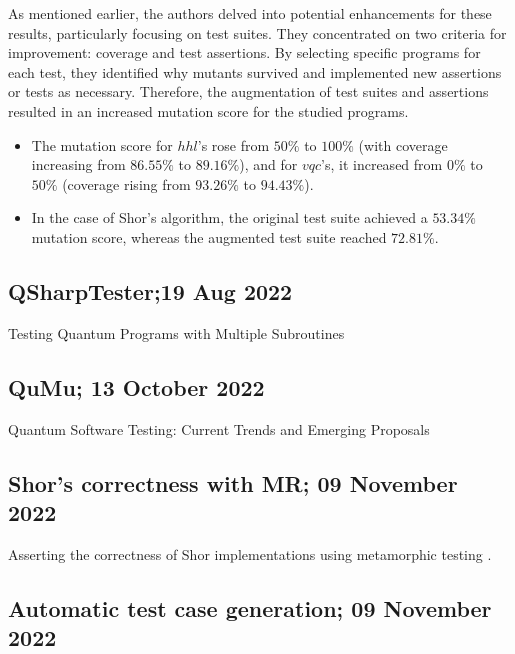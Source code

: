 \begin{itemize}
As mentioned earlier, the authors delved into potential enhancements for these results, particularly focusing on test suites. They concentrated on two criteria for improvement: coverage and test assertions. By selecting specific programs for each test, they identified why mutants survived and implemented new assertions or tests as necessary. Therefore, the augmentation of test suites and assertions resulted in an increased mutation score for the studied programs.

\begin{itemize}
    \item The mutation score for $hhl$’s rose from $50\%$ to $100\%$ (with coverage increasing from $86.55\%$ to $89.16\%$), and for $vqc$’s, it increased from $0\%$ to $50\%$ (coverage rising from $93.26\%$ to $94.43\%$).
    \item In the case of Shor's algorithm, the original test suite achieved a $53.34\%$ mutation score, whereas the augmented test suite reached $72.81\%$.
\end{itemize}

\vspace{15pt}
\subsection{QSharpTester;19 Aug 2022}

Testing Quantum Programs with Multiple Subroutines \cite{long2022testing}

\vspace{15pt}
\subsection{QuMu; 13 October 2022}

Quantum Software Testing: Current Trends and Emerging Proposals \cite{de2022quantum}

\vspace{15pt}
\subsection{Shor's correctness with MR; 09 November 2022}

Asserting the correctness of Shor implementations using metamorphic testing \cite{costa2022asserting}.

\vspace{15pt}
\subsection{Automatic test case generation; 09 November 2022}


\end{itemize}
